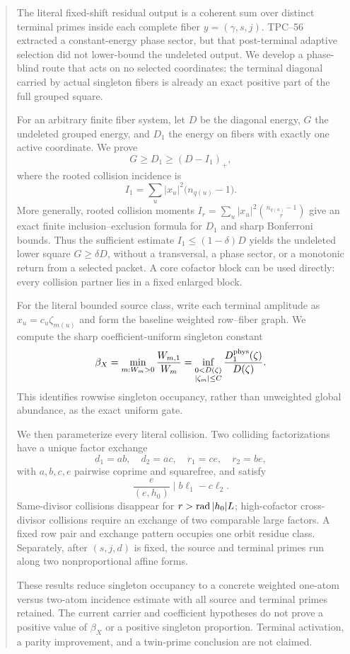 \begin{abstract}
The literal fixed-shift residual output is a coherent sum over distinct
terminal primes inside each complete fiber \(y=(\gamma,s,j)\).  TPC--56
extracted a constant-energy phase sector, but that post-terminal adaptive
selection did not lower-bound the undeleted output.  We develop a
phase-blind route that acts on no selected coordinates: the terminal
diagonal carried by actual singleton fibers is already an exact positive
part of the full grouped square.

For an arbitrary finite fiber system, let \(D\) be the diagonal energy,
\(G\) the undeleted grouped energy, and \(D_1\) the energy on fibers with
exactly one active coordinate.  We prove
\[
 G\ge D_1\ge(D-I_1)_+,
\]
where the rooted collision incidence is
\[
 I_1=\sum_u|x_u|^2\bigl(n_{q(u)}-1\bigr).
\]
More generally, rooted collision moments
\(I_r=\sum_u|x_u|^2\binom{n_{q(u)}-1}{r}\) give an exact finite
inclusion--exclusion formula for \(D_1\) and sharp Bonferroni bounds.  Thus
the sufficient estimate \(I_1\le(1-\delta)D\) yields the undeleted lower
square \(G\ge\delta D\), without a transversal, a phase sector, or a
monotonic return from a selected packet.  A core cofactor block can be used
directly: every collision partner lies in a fixed enlarged block.

For the literal bounded source class, write each terminal amplitude as
\(x_u=c_u\zeta_{m(u)}\) and form the baseline weighted row--fiber graph.
We compute the sharp coefficient-uniform singleton constant
\[
 \beta_X=\min_{m:W_m>0}\frac{W_{m,1}}{W_m}
 =\inf_{\substack{0<D(\zeta)\\|\zeta_m|\le C}}
   \frac{D_1^{\rm phys}(\zeta)}{D(\zeta)}.
\]
This identifies rowwise singleton occupancy, rather than unweighted global
abundance, as the exact uniform gate.

We then parameterize every literal collision.  Two colliding factorizations
have a unique factor exchange
\[
 d_1=ab,\quad d_2=ac,\quad r_1=ce,\quad r_2=be,
\]
with \(a,b,c,e\) pairwise coprime and squarefree, and satisfy
\[
 \frac{e}{(e,h_0)}\mid b\ell_1-c\ell_2.
\]
Same-divisor collisions disappear for \(r>\rad|h_0|L\); high-cofactor
cross-divisor collisions require an exchange of two comparable large
factors.  A fixed row pair and exchange pattern occupies one orbit residue
class.  Separately, after \((s,j,d)\) is fixed, the source and terminal
primes run along two nonproportional affine forms.

These results reduce singleton occupancy to a concrete weighted one-atom
versus two-atom incidence estimate with all source and terminal primes
retained.  The current carrier and coefficient
hypotheses do not prove a positive value of \(\beta_X\) or a positive
singleton proportion.  Terminal activation, a parity improvement, and a
twin-prime conclusion are not claimed.
\end{abstract}
